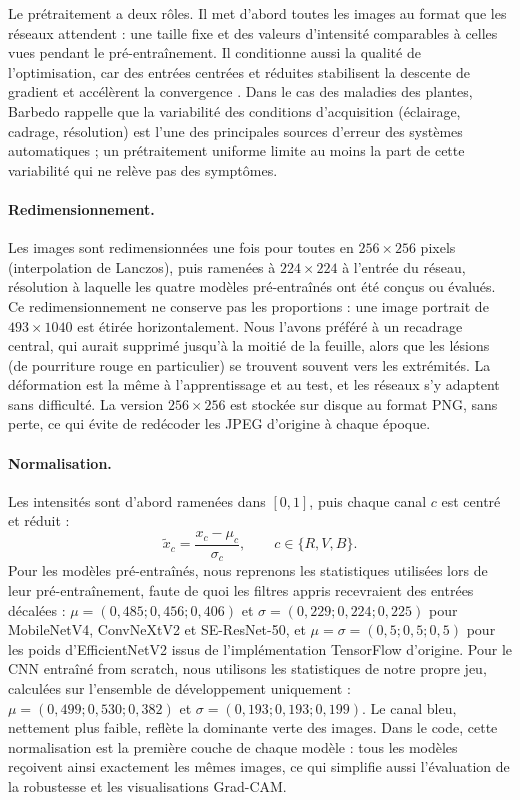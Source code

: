 Le prétraitement a deux rôles. Il met d'abord toutes les images au format que les réseaux attendent : une taille fixe et des valeurs d'intensité comparables à celles vues pendant le pré-entraînement. Il conditionne aussi la qualité de l'optimisation, car des entrées centrées et réduites stabilisent la descente de gradient et accélèrent la convergence \cite{ioffe2015batch}. Dans le cas des maladies des plantes, Barbedo rappelle que la variabilité des conditions d'acquisition (éclairage, cadrage, résolution) est l'une des principales sources d'erreur des systèmes automatiques \cite{barbedo2016review} ; un prétraitement uniforme limite au moins la part de cette variabilité qui ne relève pas des symptômes.

\paragraph{Redimensionnement.} Les images sont redimensionnées une fois pour toutes en $256\times256$ pixels (interpolation de Lanczos), puis ramenées à $224\times224$ à l'entrée du réseau, résolution à laquelle les quatre modèles pré-entraînés ont été conçus ou évalués. Ce redimensionnement ne conserve pas les proportions : une image portrait de $493\times1040$ est étirée horizontalement. Nous l'avons préféré à un recadrage central, qui aurait supprimé jusqu'à la moitié de la feuille, alors que les lésions (de pourriture rouge en particulier) se trouvent souvent vers les extrémités. La déformation est la même à l'apprentissage et au test, et les réseaux s'y adaptent sans difficulté. La version $256\times256$ est stockée sur disque au format PNG, sans perte, ce qui évite de redécoder les JPEG d'origine à chaque époque.

\paragraph{Normalisation.} Les intensités sont d'abord ramenées dans $[0,1]$, puis chaque canal $c$ est centré et réduit :
\begin{equation}
\tilde{x}_c = \frac{x_c - \mu_c}{\sigma_c}, \qquad c \in \{R, V, B\}.
\label{eq:norm}
\end{equation}
Pour les modèles pré-entraînés, nous reprenons les statistiques utilisées lors de leur pré-entraînement, faute de quoi les filtres appris recevraient des entrées décalées : $\mu=(0{,}485 ; 0{,}456 ; 0{,}406)$ et $\sigma=(0{,}229 ; 0{,}224 ; 0{,}225)$ pour MobileNetV4, ConvNeXtV2 et SE-ResNet-50, et $\mu=\sigma=(0{,}5 ; 0{,}5 ; 0{,}5)$ pour les poids d'EfficientNetV2 issus de l'implémentation TensorFlow d'origine. Pour le CNN entraîné from scratch, nous utilisons les statistiques de notre propre jeu, calculées sur l'ensemble de développement uniquement : $\mu=(0{,}499 ; 0{,}530 ; 0{,}382)$ et $\sigma=(0{,}193 ; 0{,}193 ; 0{,}199)$. Le canal bleu, nettement plus faible, reflète la dominante verte des images. Dans le code, cette normalisation est la première couche de chaque modèle : tous les modèles reçoivent ainsi exactement les mêmes images, ce qui simplifie aussi l'évaluation de la robustesse et les visualisations Grad-CAM.

